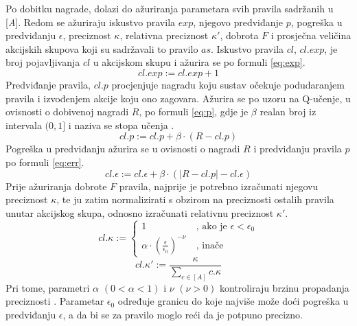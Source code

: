 \documentclass[times, utf8, zavrsni]{fer}
\begin{document}
Po dobitku nagrade, dolazi do ažuriranja parametara svih pravila sadržanih u [\emph{A}].
Redom se ažuriraju iskustvo pravila  $exp$, njegovo predviđanje  $p$, pogreška u predviđanju  $\epsilon$, preciznost  $\kappa$, relativna preciznost  $\kappa'$, dobrota $F$ i prosječna veličina akcijskih skupova koji su sadržavali to pravilo  $as$.
Iskustvo pravila $cl$, $cl.exp$, je broj pojavljivanja $cl$ u akcijskom skupu i ažurira se po formuli \eqref{eq:exp}.
\begin{equation}
    \label{eq:exp}
    cl.exp := cl.exp + 1
\end{equation}
Predviđanje pravila, $cl.p$ procjenjuje nagradu koju sustav očekuje podudaranjem pravila i izvođenjem akcije koju ono zagovara.
Ažurira se po uzoru na Q-učenje, u ovisnosti o dobivenoj nagradi $R$, po formuli \eqref{eq:p}, gdje je $\beta$ realan broj iz intervala $(0, 1]$ i naziva se stopa učenja .
\begin{equation}
    \label{eq:p}
    cl.p := cl.p + \beta \cdot (R - cl.p)
\end{equation}
Pogreška u predviđanju ažurira se u ovisnosti o nagradi $R$ i predviđanju pravila $p$ po formuli \eqref{eq:err}.
\begin{equation}
    \label{eq:err}
    cl.\epsilon := cl.\epsilon + \beta \cdot (|R - cl.p| - cl.\epsilon)
\end{equation}
Prije ažuriranja dobrote $F$ pravila, najprije je potrebno izračunati njegovu preciznost $\kappa$, te ju zatim normalizirati s obzirom na preciznosti ostalih pravila unutar akcijskog skupa, odnosno izračunati relativnu preciznost $\kappa'$.
\begin{equation}
    \label{eq:acc}
    cl.\kappa :=
    \begin{cases}
        1 &\ \mbox{, ako je } \epsilon < \epsilon_{0} \\
        \alpha \cdot \left( \frac{\epsilon}{\epsilon_{0}} \right)^{-\nu} &\ \mbox{, inače}
    \end{cases}
\end{equation}
\begin{equation}
    \label{eq:racc}
    cl.\kappa' := \frac{\kappa}{\sum_{c \in [A]} c.\kappa}
\end{equation}
Pri tome, parametri $\alpha$ $(0 < \alpha < 1)$ i $\nu$ $(\nu > 0)$ kontroliraju brzinu propadanja preciznosti \citep{5}.
Parametar $\epsilon_{0}$ određuje granicu do koje najviše može doći pogreška u predviđanju $\epsilon$, a da bi se za pravilo moglo reći da je potpuno precizno.
\end{document}
